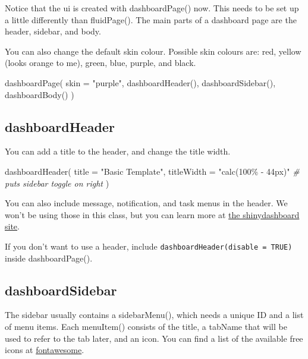 \documentclass[
]{book}
\newenvironment{Shaded}{\begin{snugshade}}{\end{snugshade}}
\newcommand{\AttributeTok}[1]{\textcolor[rgb]{0.77,0.63,0.00}{#1}}
\newcommand{\CommentTok}[1]{\textcolor[rgb]{0.56,0.35,0.01}{\textit{#1}}}
\newcommand{\FunctionTok}[1]{\textcolor[rgb]{0.00,0.00,0.00}{#1}}
\newcommand{\NormalTok}[1]{#1}
\newcommand{\StringTok}[1]{\textcolor[rgb]{0.31,0.60,0.02}{#1}}
\begin{document}
Notice that the ui is created with dashboardPage() now. This needs to be set up a little differently than fluidPage(). The main parts of a dashboard page are the header, sidebar, and body.

You can also change the default skin colour. Possible skin colours are: red, yellow (looks orange to me), green, blue, purple, and black.

\begin{Shaded}
\begin{Highlighting}[]
\FunctionTok{dashboardPage}\NormalTok{(}
    \AttributeTok{skin =} \StringTok{"purple"}\NormalTok{,}
    \FunctionTok{dashboardHeader}\NormalTok{(),}
    \FunctionTok{dashboardSidebar}\NormalTok{(),}
    \FunctionTok{dashboardBody}\NormalTok{()}
\NormalTok{)}
\end{Highlighting}
\end{Shaded}

\hypertarget{dashboardheader}{%
\subsection{dashboardHeader}\label{dashboardheader}}

You can add a title to the header, and change the title width.

\begin{Shaded}
\begin{Highlighting}[]
\FunctionTok{dashboardHeader}\NormalTok{(}
  \AttributeTok{title =} \StringTok{"Basic Template"}\NormalTok{, }
  \AttributeTok{titleWidth =} \StringTok{"calc(100\% {-} 44px)"} \CommentTok{\# puts sidebar toggle on right}
\NormalTok{)}
\end{Highlighting}
\end{Shaded}

You can also include message, notification, and task menus in the header. We won't be using those in this class, but you can learn more at \href{https://rstudio.github.io/shinydashboard/structure.html\#message-menus}{the shinydashboard site}.

If you don't want to use a header, include \texttt{dashboardHeader(disable\ =\ TRUE)} inside dashboardPage().

\hypertarget{dashboardsidebar}{%
\subsection{dashboardSidebar}\label{dashboardsidebar}}

The sidebar usually contains a sidebarMenu(), which needs a unique ID and a list of menu items. Each menuItem() consists of the title, a tabName that will be used to refer to the tab later, and an icon. You can find a list of the available free icons at \href{https://fontawesome.com/icons?d=gallery\&m=free}{fontawesome}.
\end{document}
